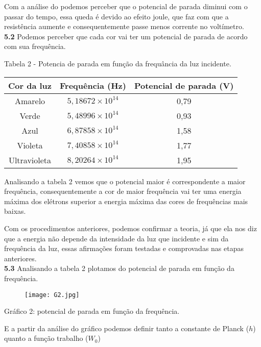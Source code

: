 \documentclass[12pt, a4paper]{article}
\begin{document}
\quad Com a análise do podemos perceber que o potencial de parada diminui com o passar do tempo, essa queda é devido ao efeito joule, que faz com que a resistência aumente e consequentemente passe menos corrente no voltímetro. \\

\quad \textbf{5.2} Podemos perceber que cada cor vai ter um potencial de parada de acordo com sua frequência.

\begin{center}
\quad Tabela 2 - Potencia de parada em função da frequância da luz incidente.
    \begin{tabular}{|c|c|c|}\hline
        Cor da luz & Frequência (Hz) & Potencial de parada (V) \\ \hline
         Amarelo & $5,18672\times 10^{14}$ & 0,79\\ \hline
         Verde & $5,48996\times 10^{14}$ & 0,93\\ \hline
         Azul & $6,87858\times 10^{14}$ & 1,58\\ \hline
         Violeta & $7,40858\times 10^{14}$ & 1,77\\ \hline
         Ultravioleta & $8,20264\times 10^{14}$ & 1,95 \\ \hline
    \end{tabular}
\end{center}

\quad Analisando a tabela 2 vemos que o potencial maior é correspondente a maior frequência, consequentemente a cor de maior frequência vai ter uma energia máxima dos elétrons superior a energia máxima das cores de frequências mais baixas.

\quad Com os procedimentos anteriores, podemos confirmar a teoria, já que ela nos diz que a energia não depende da intensidade da luz que incidente e sim da frequência da luz, essas afirmações foram testadas  e comprovadas nas etapas anteriores.\\

\newpage
\quad \textbf{5.3} Analisando a tabela 2 plotamos do potencial de parada em função da frequência.

\begin{center}
    \begin{figure}[h]
        \centering
        \texttt{[image: G2.jpg]}
        \label{fig:my_label}
    \end{figure}
    Gráfico 2: potencial de parada em função da frequência.
\end{center}

\quad E a partir da análise do gráfico podemos definir tanto a constante de Planck ($h$) quanto a função trabalho ($W_{0}$)
\end{document}
